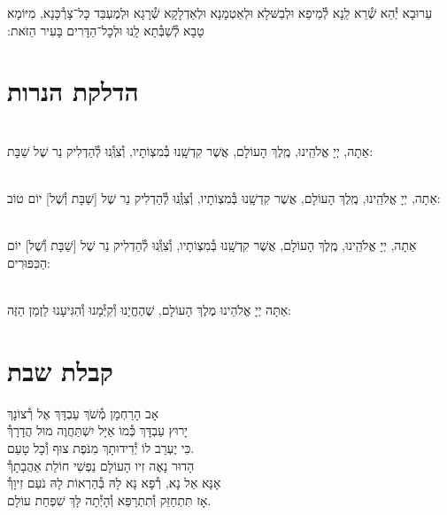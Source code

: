 \documentclass[twoside, openany, parskip=half, 11pt]{book}
\begin{document}
עֵרוּבָא יְ֯הֵא שְׁ֯רֵא לַֽנָא לְ֯מֵיפֵא וּלְבַשּּׁלָא וּלְאַטְמָנָא וּלְאַדְלָקָא שְׁ֯רָגָא וּלְמֶעְבַּד כָּל־צָרְ֯כָּנָא, מִיּוֹמָא טָבָא לְ֯שַׁבְּ֯תָא לָֽנוּ וּלְכׇל־הַדָּרִים בָּעִיר הַזּׂאת:‏


\vspace{\baselineskip}
{\let\clearpage\relax
\chapter[הדלקת הנרות שבת ויום טוב]{ הדלקת הנרות }}

\\
אַתָה, יְיָ אֱלֹהֵֽינוּ, מֶֽלֶךְ הָעוֹלָם, אֲשֶׁר קִדְשָֽׁנוּ בְּ֯מִצְוֹתָיו, וְ֯צִוְּֽ֯נוּ לְ֯הַדְלִיק נֵר שֶׁל שַׁבָּת:

\\
אַתָה, יְיָ אֱלֹהֵֽינוּ, מֶֽלֶךְ הָעוֹלָם, אֲשֶׁר קִדְשָֽׁנוּ בְּ֯מִצְוֹתָיו, וְ֯צִוְּֽ֯נוּ לְ֯הַדְלִיק נֵר שֶׁל
[שַׁבָּת וְ֯שֶׁל] יוֹם טוֹב:

\\
אַתָה, יְיָ אֱלֹהֵֽינוּ, מֶֽלֶךְ הָעוֹלָם, אֲשֶׁר קִדְשָֽׁנוּ בְּ֯מִצְוֹתָיו, וְ֯צִוְּֽ֯נוּ לְ֯הַדְלִיק נֵר שֶׁל
[שַׁבָּת וְ֯שֶׁל] יוֹם הַכִּפּוּרִים:

\\
אַתָּה יְיָ אֱלֹהֵינוּ מֶלֶךְ הָעוֹלָם, שֶׁהֶחֱיָנוּ וְ֯קִיְּ֯מָנוּ וְ֯הִגִּיעָנוּ לַזְמַן הַזֶּה:



\chapter[קבלת שבת]{ קבלת שבת }
\label{kabalas_shabbos}

אָב הָרַחְמָן מְ֯שֹׁךְ עַבְדָּךְ אֶל רְ֯צוֹנָךְ\\
יָרוּץ עַבְדָּךְ כְּ֯מוֹ אַיָּל יִשְׁתַּחֲוֶה מוּל הֲדָרָךְ֯\\
כִּי יֶעְרַב לוֹ יְ֯דִידוּתָךְ מִנֹּפֶת צוּף וְ֯כָל טָעַם.\\


הָדוּר נָאֶה זִיו הָעוֹלָם נַפְשִׁי חוֹלַת אַהֲבָתָךְ֯\\
אָנָּא אֵל נָא, רְ֯פָא נָא לָהּ בְּ֯הַרְאוֹת לָהּ נֹעַם זִיוָךְ֯\\
אָז תִּתְחַזֵּק וְ֯תִתְרַפֵּא וְ֯הָיְ֯תָה לָּךְ שִׁפְחַת עוֹלָם.\\
\end{document}
